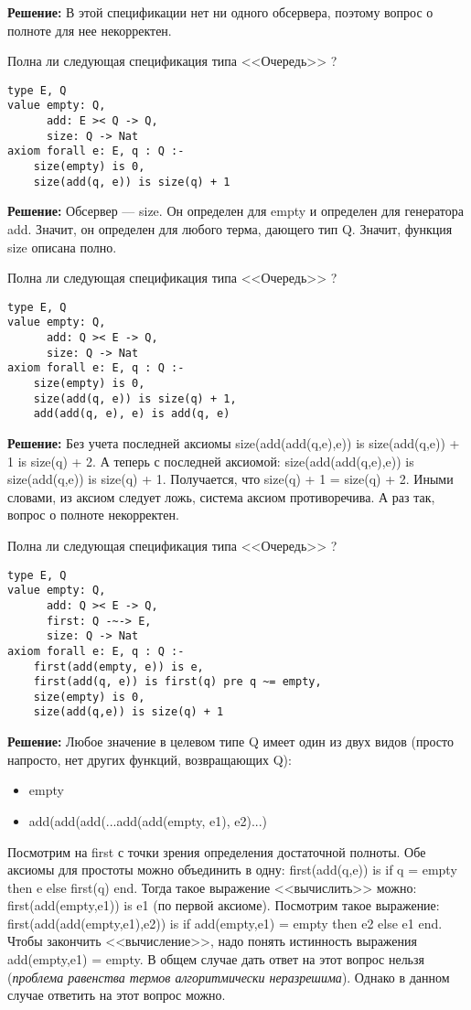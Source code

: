 \textbf{Решение:}
В этой спецификации нет ни одного обсервера, поэтому вопрос о полноте для нее некорректен.

\z Полна ли следующая спецификация типа <<Очередь>> ?
\begin{lstlisting}
type E, Q
value empty: Q,
      add: E >< Q -> Q,
      size: Q -> Nat
axiom forall e: E, q : Q :-
    size(empty) is 0,
    size(add(q, e)) is size(q) + 1
\end{lstlisting}

\textbf{Решение:}
Обсервер --- size. Он определен для empty и определен для генератора add. Значит, он определен для любого терма, дающего тип Q. Значит, функция size описана полно.

\z Полна ли следующая спецификация типа <<Очередь>> ?
\begin{lstlisting}
type E, Q
value empty: Q,
      add: Q >< E -> Q,
      size: Q -> Nat
axiom forall e: E, q : Q :-
    size(empty) is 0,
    size(add(q, e)) is size(q) + 1,
    add(add(q, e), e) is add(q, e)
\end{lstlisting}

\textbf{Решение:}
Без учета последней аксиомы size(add(add(q,e),e)) is size(add(q,e)) + 1 is size(q) + 2. А теперь с последней аксиомой: size(add(add(q,e),e)) is size(add(q,e)) is size(q) + 1. Получается, что size(q) + 1 = size(q) + 2. Иными словами, из аксиом следует ложь, система аксиом противоречива. А раз так, вопрос о полноте некорректен.


\z Полна ли следующая спецификация типа <<Очередь>> ?
\begin{lstlisting}
type E, Q
value empty: Q,
      add: Q >< E -> Q,
      first: Q -~-> E,
      size: Q -> Nat
axiom forall e: E, q : Q :-
    first(add(empty, e)) is e,
    first(add(q, e)) is first(q) pre q ~= empty,
    size(empty) is 0,
    size(add(q,e)) is size(q) + 1
\end{lstlisting}

\textbf{Решение:}
Любое значение в целевом типе Q имеет один из двух видов (просто напросто, нет других функций, возвращающих Q):
\begin{itemize}
  \item empty
  \item add(add(add(...add(add(empty, e1), e2)...)
\end{itemize}

Посмотрим на first с точки зрения определения достаточной полноты. Обе аксиомы для простоты можно объединить в одну: first(add(q,e)) is if q = empty then e else first(q) end. Тогда такое выражение <<вычислить>> можно: first(add(empty,e1)) is e1 (по первой аксиоме). Посмотрим такое выражение: first(add(add(empty,e1),e2)) is if add(empty,e1) = empty then e2 else e1 end. Чтобы закончить <<вычисление>>, надо понять истинность выражения add(empty,e1) = empty. В общем случае дать ответ на этот вопрос нельзя (\emph{проблема равенства термов алгоритмически неразрешима}). Однако в данном случае ответить на этот вопрос можно.

